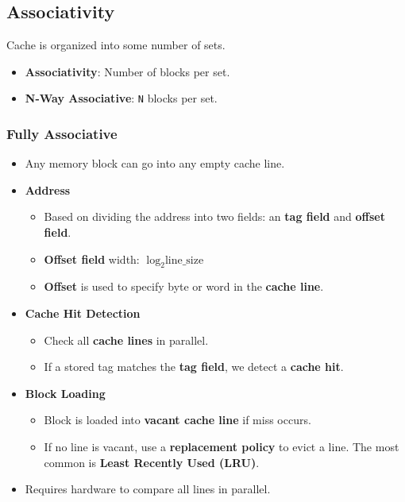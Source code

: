 \documentclass[12pt, letterpaper]{article}
\begin{document}
\subsection*{Associativity}

Cache is organized into some number of sets.

\begin{itemize}
  \item \textbf{Associativity}: Number of blocks per set.
  \item \textbf{N-Way Associative}: \texttt{N} blocks per set.
\end{itemize}

\subsubsection*{Fully Associative}

\begin{itemize}
  \item Any memory block can go into any empty cache line.
  \item \textbf{Address}
    \begin{itemize}
      \item Based on dividing the address into two fields: an
        \textbf{tag field} and \textbf{offset field}.
      \item \textbf{Offset field} width: $ \log_2 \textrm{line\_size} $
      \item \textbf{Offset} is used to specify byte or word in the
        \textbf{cache line}.
    \end{itemize}
  \item \textbf{Cache Hit Detection}
    \begin{itemize}
      \item Check all \textbf{cache lines} in parallel.
      \item If a stored tag matches the \textbf{tag field}, we detect
        a \textbf{cache hit}.
    \end{itemize}
  \item \textbf{Block Loading}
    \begin{itemize}
      \item Block is loaded into \textbf{vacant cache line} if miss occurs.
      \item If no line is vacant, use a \textbf{replacement policy}
        to evict a line. The most common is \textbf{Least
        Recently Used (LRU)}.
    \end{itemize}
  \item Requires hardware to compare all lines in parallel.
\end{itemize}
\end{document}
